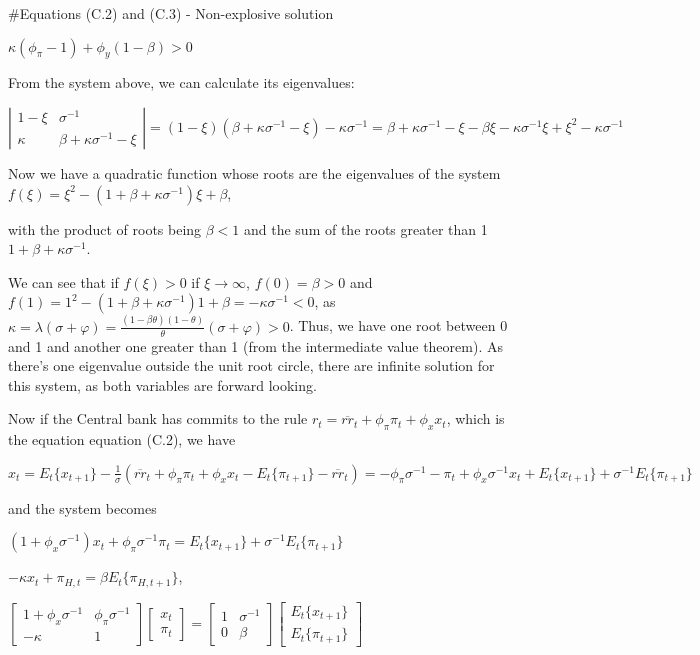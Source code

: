 \documentclass[
]{article}
\begin{document}
\#Equations (C.2) and (C.3) - Non-explosive solution

\(\kappa (\phi_\pi-1)+\phi_y(1-\beta)>0\)

\vspace{8pt}

From the system above, we can calculate its eigenvalues:

\(\left| \begin{matrix} 1-\xi & \sigma^{-1} \\ \kappa & \beta +\kappa \sigma^{-1}-\xi \end{matrix} \right|=(1-\xi)(\beta +\kappa \sigma^{-1}-\xi)-\kappa \sigma^{-1}= \beta +\kappa \sigma^{-1}-\xi - \beta \xi -\kappa \sigma^{-1} \xi+\xi^2 -\kappa \sigma^{-1}\)

Now we have a quadratic function whose roots are the eigenvalues of the
system \(f(\xi)=\xi^2-(1+\beta+\kappa \sigma^{-1})\xi+\beta\),

with the product of roots being \(\beta<1\) and the sum of the roots
greater than 1 \(1+\beta+\kappa \sigma^{-1}\).

We can see that if \(f(\xi)>0\) if \(\xi \rightarrow \infty\),
\(f(0)=\beta>0\) and
\(f(1)=1^2-(1+\beta+\kappa \sigma^{-1})1+\beta=-\kappa \sigma^{-1}<0\),
as
\(\displaystyle \kappa=\lambda(\sigma+\varphi)=\frac{(1-\beta \theta)(1-\theta)}{\theta}(\sigma+\varphi)>0\).
Thus, we have one root between 0 and 1 and another one greater than 1
(from the intermediate value theorem). As there's one eigenvalue outside
the unit root circle, there are infinite solution for this system, as
both variables are forward looking.

Now if the Central bank has commits to the rule
\(r_t=\overline{rr}_t+\phi_\pi \pi_t+\phi_x x_t\), which is the equation
equation (C.2), we have

\(\displaystyle x_t = E_t\{x_{t+1}\} -\frac{1}{\sigma}(\overline{rr}_t+\phi_\pi \pi_{t}+\phi_x x_t-E_t\{\pi_{t+1}\} -\overline{rr}_t)= -\phi_\pi \sigma^{-1} -\pi_{t}+\phi_x \sigma^{-1} x_t + E_t\{x_{t+1}\}+ \sigma^{-1}E_t\{\pi_{t+1}\}\)

and the system becomes

\(\displaystyle (1+\phi_x \sigma^{-1})x_t +\phi_\pi \sigma^{-1}\pi_{t} = E_t\{x_{t+1}\} +\sigma^{-1}E_t\{\pi_{t+1}\}\)

\(-\kappa x_t +\pi_{H,t}=\beta E_t\{ \pi_{H,t+1}\}\),

\(\displaystyle \left[ \begin{matrix} 1+\phi_x \sigma^{-1} & \phi_\pi \sigma^{-1}\\ -\kappa & 1 \end{matrix} \right] \left[ \begin{matrix} x_t\\ \pi_t \end{matrix} \right] = \left[ \begin{matrix} 1 & \sigma^{-1} \\ 0 & \beta \end{matrix} \right] \left[ \begin{matrix} E_t\{x_{t+1} \}\\ E_t \{\pi_{t+1} \} \end{matrix} \right]\)
\end{document}
